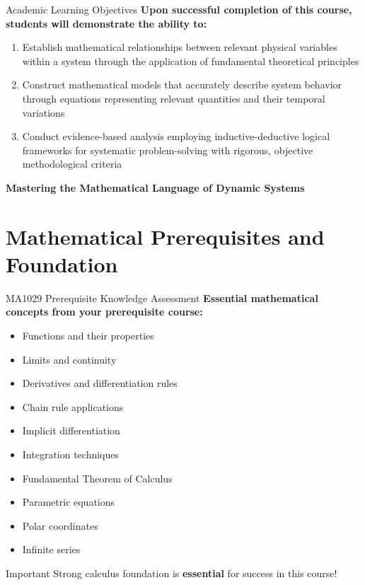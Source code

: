 \documentclass[10pt,aspectratio=169]{beamer}
\newcommand{\concept}[1]{\textbf{#1}}
\begin{document}
\begin{frame}{Academic Learning Objectives}
    \concept{Upon successful completion of this course, students will demonstrate the ability to:}
    
    
    \begin{enumerate}
        \item Establish mathematical relationships between relevant physical variables within a system through the application of fundamental theoretical principles
        
        
        \item Construct mathematical models that accurately describe system behavior through equations representing relevant quantities and their temporal variations
        
        
        \item Conduct evidence-based analysis employing inductive-deductive logical frameworks for systematic problem-solving with rigorous, objective methodological criteria
    \end{enumerate}
    
    
    \begin{center}
        \large\textbf{Mastering the Mathematical Language of Dynamic Systems}
    \end{center}
\end{frame}

\section{Mathematical Prerequisites and Foundation}

\begin{frame}{MA1029 Prerequisite Knowledge Assessment}
    \concept{Essential mathematical concepts from your prerequisite course:}
    
    
    \begin{multicols}{2}
    \begin{itemize}
        \item Functions and their properties
        \item Limits and continuity
        \item Derivatives and differentiation rules
        \item Chain rule applications
        \item Implicit differentiation
        \item Integration techniques
        \item Fundamental Theorem of Calculus
        \item Parametric equations
        \item Polar coordinates
        \item Infinite series
    \end{itemize}
    \end{multicols}
    
    
    \begin{alertblock}{Important}
        Strong calculus foundation is \textbf{essential} for success in this course!
    \end{alertblock}
\end{frame}
\end{document}
